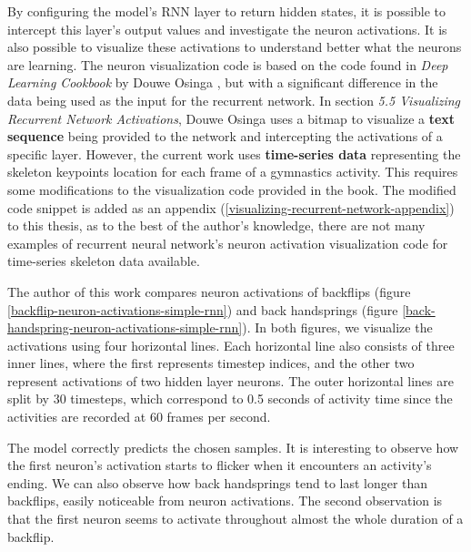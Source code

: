 By configuring the model's RNN layer to return hidden states, it is possible to intercept this layer's output values and investigate the neuron activations. It is also possible to visualize these activations to understand better what the neurons are learning. The neuron visualization code is based on the code found in \textit{Deep Learning Cookbook} by Douwe Osinga \cite{deep-learning-cookbook}, but with a significant difference in the data being used as the input for the recurrent network. In section \textit{5.5 Visualizing Recurrent Network Activations}, Douwe Osinga uses a bitmap to visualize a \textbf{text sequence} being provided to the network and intercepting the activations of a specific layer. However, the current work uses \textbf{time-series data} representing the skeleton keypoints location for each frame of a gymnastics activity. This requires some modifications to the visualization code provided in the book. The modified code snippet is added as an appendix (\ref{visualizing-recurrent-network-appendix}) to this thesis, as to the best of the author's knowledge, there are not many examples of recurrent neural network's neuron activation visualization code for time-series skeleton data available.

The author of this work compares neuron activations of backflips (figure \ref{backflip-neuron-activations-simple-rnn}) and back handsprings (figure \ref{back-handspring-neuron-activations-simple-rnn}). In both figures, we visualize the activations using four horizontal lines. Each horizontal line also consists of three inner lines, where the first represents timestep indices, and the other two represent activations of two hidden layer neurons. The outer horizontal lines are split by 30 timesteps, which correspond to 0.5 seconds of activity time since the activities are recorded at 60 frames per second.

The model correctly predicts the chosen samples. It is interesting to observe how the first neuron's activation starts to flicker when it encounters an activity's ending. We can also observe how back handsprings tend to last longer than backflips, easily noticeable from neuron activations. The second observation is that the first neuron seems to activate throughout almost the whole duration of a backflip. 

